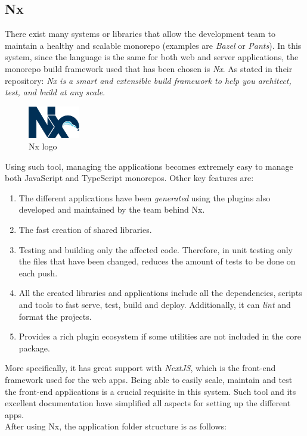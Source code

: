 \documentclass[a4paper, 12pt, oneside]{book}
\begin{document}
\subsection{Nx}
There exist many systems or libraries that allow the development team to maintain a healthy and scalable monorepo (examples are \emph{Bazel} or \emph{Pants}). In this system, since the language is the same for both web and server applications, the monorepo build framework used that has been chosen is \emph{Nx}. As stated in their repository: \emph{Nx is a smart and extensible build framework to help you architect, test, and build at any scale}.
\begin{figure}[H]
	\centering
	\includegraphics[width=0.2\textwidth]{assets/nx-logo.png}
	\caption{Nx logo}
\end{figure}
Using such tool, managing the applications becomes extremely easy to manage both JavaScript and TypeScript monorepos. Other key features are:
\begin{enumerate}[label = -]
	\item The different applications have been \emph{generated} using the plugins also developed and maintained by the team behind Nx.
	\item The fast creation of shared libraries.
	\item Testing and building only the affected code. Therefore, in unit testing only the files that have been changed, reduces the amount of tests to be done on each push.
	\item All the created libraries and applications include all the dependencies, scripts and tools to fast serve, test, build and deploy. Additionally, it can \emph{lint} and format the projects.
	\item Provides a rich plugin ecosystem if some utilities are not included in the core package.
\end{enumerate}
More specifically, it has great support with \emph{NextJS}, which is the front-end framework used for the web apps. Being able to easily scale, maintain and test the front-end applications is a crucial requisite in this system. Such tool and its excellent documentation have simplified all aspects for setting up the different apps.
\\[8pt]
After using Nx, the application folder structure is as follows:
\end{document}
